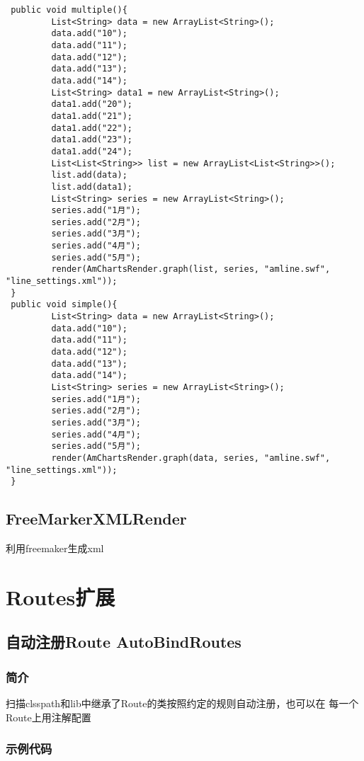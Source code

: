 \documentclass{scrartcl}
\begin{document}
\begin{verbatim}
 public void multiple(){
         List<String> data = new ArrayList<String>();
         data.add("10");
         data.add("11");
         data.add("12");
         data.add("13");
         data.add("14");
         List<String> data1 = new ArrayList<String>();
         data1.add("20");
         data1.add("21");
         data1.add("22");
         data1.add("23");
         data1.add("24");
         List<List<String>> list = new ArrayList<List<String>>();
         list.add(data);
         list.add(data1);
         List<String> series = new ArrayList<String>();
         series.add("1月");
         series.add("2月");
         series.add("3月");
         series.add("4月");
         series.add("5月");
         render(AmChartsRender.graph(list, series, "amline.swf", "line_settings.xml"));
 }
 public void simple(){
         List<String> data = new ArrayList<String>();
         data.add("10");
         data.add("11");
         data.add("12");
         data.add("13");
         data.add("14");
         List<String> series = new ArrayList<String>();
         series.add("1月");
         series.add("2月");
         series.add("3月");
         series.add("4月");
         series.add("5月");
         render(AmChartsRender.graph(data, series, "amline.swf", "line_settings.xml"));
 }
\end{verbatim}
\subsection{FreeMarkerXMLRender}
\label{sec-3-6}

利用freemaker生成xml
\section{Routes扩展}
\label{sec-4}
\subsection{自动注册Route AutoBindRoutes}
\label{sec-4-1}
\subsubsection{简介}
\label{sec-4-1-1}

    扫描clsspath和lib中继承了Route的类按照约定的规则自动注册，也可以在
    每一个Route上用注解配置
\subsubsection{示例代码}
\label{sec-4-1-2}
\end{document}
